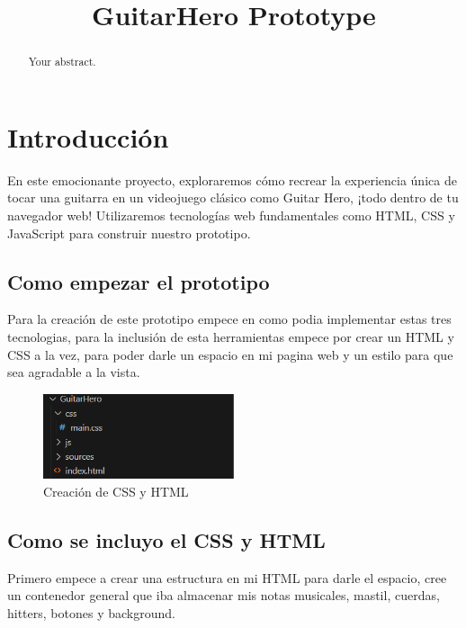 \documentclass[conference]{IEEEtran}
\title{GuitarHero Prototype}
\author{\IEEEauthorblockN{Juan David Cotacio Sánchez}}
\begin{document}
\maketitle

\begin{abstract}
Your abstract.
\end{abstract}

\section{Introducción}
En este emocionante proyecto, exploraremos cómo recrear la experiencia única de tocar una guitarra en un videojuego clásico como Guitar Hero, ¡todo dentro de tu navegador web! Utilizaremos tecnologías web fundamentales como HTML, CSS y JavaScript para construir nuestro prototipo.





\subsection{Como empezar el prototipo}

Para la creación de este prototipo empece en como podia implementar estas tres tecnologias, para la inclusión de esta herramientas empece por crear un HTML y CSS a la vez, para poder darle un espacio en mi pagina web y un estilo para que sea agradable a la vista.
\begin{figure}[h] %
    \centering
    \includegraphics[width=0.5\textwidth]{Guitar Hero One.png} %
    \caption{Creación de CSS y HTML}
    \label{fig:mi_imagen}
\end{figure}

\subsection{Como se incluyo el CSS y HTML}
Primero empece a crear una estructura en mi HTML para darle el espacio, cree un contenedor general que iba almacenar mis notas musicales, mastil, cuerdas, hitters, botones y background.
\end{document}
